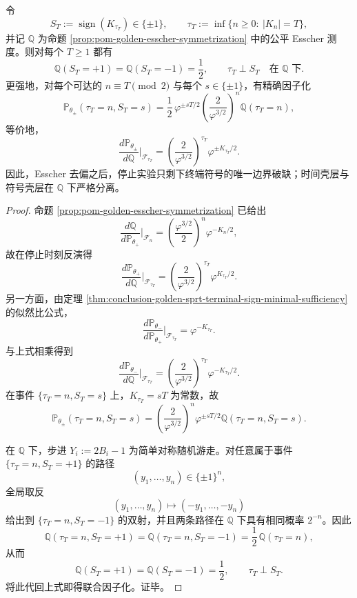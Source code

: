 \begin{theorem}\label{thm:conclusion-golden-sprt-esscher-boundary-symmetry}
令
\[
S_T:=\operatorname{sign}(K_{\tau_T})\in\{\pm1\},
\qquad
\tau_T:=\inf\{n\ge 0:\ |K_n|=T\},
\]
并记 \(\mathbb Q\) 为命题 \ref{prop:pom-golden-esscher-symmetrization} 中的公平 Esscher 测度。则对每个 \(T\ge 1\) 都有
\[
\mathbb Q(S_T=+1)=\mathbb Q(S_T=-1)=\frac12,
\qquad
\tau_T\perp S_T
\quad\text{在 }\mathbb Q\text{ 下}.
\]
更强地，对每个可达的 \(n\equiv T\pmod 2\) 与每个 \(s\in\{\pm1\}\)，有精确因子化
\[
\mathbb P_{\theta_\pm}(\tau_T=n,S_T=s)
=
\frac12\,\varphi^{\pm sT/2}
\left(\frac{2}{\varphi^{3/2}}\right)^n
\mathbb Q(\tau_T=n),
\]
等价地，
\[
\frac{d\mathbb P_{\theta_\pm}}{d\mathbb Q}\Big|_{\mathcal F_{\tau_T}}
=
\left(\frac{2}{\varphi^{3/2}}\right)^{\tau_T}\varphi^{\pm K_{\tau_T}/2}.
\]
因此，Esscher 去偏之后，停止实验只剩下终端符号的唯一边界破缺；时间壳层与符号壳层在 \(\mathbb Q\) 下严格分离。
\end{theorem}
\begin{proof}
命题 \ref{prop:pom-golden-esscher-symmetrization} 已给出
\[
\frac{d\mathbb Q}{d\mathbb P_{\theta_+}}\Big|_{\mathcal F_n}
=
\left(\frac{\varphi^{3/2}}{2}\right)^n\varphi^{-K_n/2},
\]
故在停止时刻反演得
\[
\frac{d\mathbb P_{\theta_+}}{d\mathbb Q}\Big|_{\mathcal F_{\tau_T}}
=
\left(\frac{2}{\varphi^{3/2}}\right)^{\tau_T}\varphi^{K_{\tau_T}/2}.
\]
另一方面，由定理 \ref{thm:conclusion-golden-sprt-terminal-sign-minimal-sufficiency} 的似然比公式，
\[
\frac{d\mathbb P_{\theta_-}}{d\mathbb P_{\theta_+}}\Big|_{\mathcal F_{\tau_T}}
=
\varphi^{-K_{\tau_T}}.
\]
与上式相乘得到
\[
\frac{d\mathbb P_{\theta_-}}{d\mathbb Q}\Big|_{\mathcal F_{\tau_T}}
=
\left(\frac{2}{\varphi^{3/2}}\right)^{\tau_T}\varphi^{-K_{\tau_T}/2}.
\]
在事件 \(\{\tau_T=n,S_T=s\}\) 上，\(K_{\tau_T}=sT\) 为常数，故
\[
\mathbb P_{\theta_\pm}(\tau_T=n,S_T=s)
=
\left(\frac{2}{\varphi^{3/2}}\right)^n\varphi^{\pm sT/2}
\mathbb Q(\tau_T=n,S_T=s).
\]

在 \(\mathbb Q\) 下，步进 \(Y_i:=2B_i-1\) 为简单对称随机游走。对任意属于事件 \(\{\tau_T=n,S_T=+1\}\) 的路径
\[
(y_1,\dots,y_n)\in\{\pm1\}^n,
\]
全局取反
\[
(y_1,\dots,y_n)\longmapsto (-y_1,\dots,-y_n)
\]
给出到 \(\{\tau_T=n,S_T=-1\}\) 的双射，并且两条路径在 \(\mathbb Q\) 下具有相同概率 \(2^{-n}\)。因此
\[
\mathbb Q(\tau_T=n,S_T=+1)
=
\mathbb Q(\tau_T=n,S_T=-1)
=
\frac12\,\mathbb Q(\tau_T=n),
\]
从而
\[
\mathbb Q(S_T=+1)=\mathbb Q(S_T=-1)=\frac12,
\qquad
\tau_T\perp S_T.
\]
将此代回上式即得联合因子化。证毕。
\end{proof}

